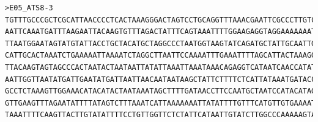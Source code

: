 \begin{verbatim}
>E05_ATS8-3
TGTTTGCCCGCTCGCATTAACCCCTCACTAAAGGGACTAGTCCTGCAGGTTTAAACGAATTCGCCCTTGTCTCTTTCTGTGTCTCAGCTTCCTCATCCTTAGGATGCCAGTATATTTCAG
AATTCAAATGATTTAAGAATTACAAGTGTTTAGACTATTTCAGTAAATTTTGGAAGAGGTAGGAAAAAAATAGGAGGTGAAGATGAGCAAAATGCATTGTATCATATATGAAATCCTCAA
TTAATGGAATAGTATGTATTACCTGCTACATGCTAGGCCCTAATGGTAAGTATCAGATGCTATTGCAATTGCTATAATTTCTATCATTTGCATGAGTATATGACTTGGTCAAGAGAACTC
CATTGCACTAAATCTGAAAAATTAAAATCTAGGCTTAATTCCAAAATTTGAAATTTTAGCATTACTAAAGGGGAGACAGCAGAGAAAATGTTTGAAACTGACCAGCTTTTTTGCACCAAG
TTACAAGTAGTAGCCCACTAATACTAATAATTATATTAAATTAAATAAACAGAGGTCATAATCAACCATATTAAGTTGACTAATTTGATTAATGTGCGTTTATTAATATTAAGTTAATTA
AATTGGTTAATATGATTGAATATGATTAATTAACAATAATAAGCTATTCTTTTCTCATTATAAATGATACCATTGAATGCCAAATGCAGGGCATATAAATTCATTAAGGACATGTAAAAG
GCCTCTAAAGTTGGAAACATACATACTAATAAATAGCTTTTGATAACCTTCCAATGCTAATCCATACATAGGACTGGTCACTAAATCATACCTCATGTGTCAAATCTACTTTTTTTTACA
GTTGAAGTTTAGAATATTTTATAGTCTTTAAATCATTAAAAAAATTATATTTTGTTTCATGTTGTGAAAATTGCATAAAACCTTAAATTGTCTATGTCCATAATTTCTAATGTAACATGG
TAAATTTTCAAGTTACTTGTATATTTTCCTGTTGGTTCTCTATTCATAATTGTATCTTGGCCCAAAAAGTAAAATGCTTTTGTCCACCTTTT
\end{verbatim}
\endgroup

